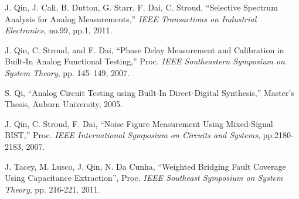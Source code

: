 \documentclass[12pt]{report}
\begin{document}
\begin{thebibliography}{99}
 J. Qin, J. Cali, B. Dutton, G. Starr, F. Dai, C. Stroud, ``Selective Spectrum Analysis for Analog Measurements,'' \textit{IEEE Transactions on Industrial Electronics}, no.99, pp.1, 2011.

 J. Qin, C. Stroud, and F. Dai, ``Phase Delay Measurement and Calibration in Built-In Analog Functional Testing,” Proc. \textit{IEEE Southeastern Symposium on System Theory}, pp. 145–149, 2007.

 S. Qi, ``Analog Circuit Testing using Built-In Direct-Digital Synthesis,'' Master's Thesis, Auburn University, 2005.

 J. Qin, C. Stroud, F. Dai, ``Noise Figure Measurement Using Mixed-Signal BIST,'' Proc. \textit{IEEE International Symposium on Circuits and Systems}, pp.2180-2183, 2007.

 J. Tacey, M. Lusco, J. Qin, N. Da Cunha, ``Weighted Bridging Fault Coverage Using Capacitance Extraction'', Proc.  \textit{IEEE Southeast Symposium on System Theory}, pp. 216-221, 2011.


\label{Bibliography}
\end{thebibliography}

\appendix
{}
\end{document}
